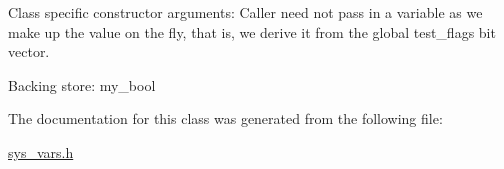 Class specific constructor arguments\+: Caller need not pass in a variable as we make up the value on the fly, that is, we derive it from the global test\+\_\+flags bit vector.

Backing store\+: my\+\_\+bool 

The documentation for this class was generated from the following file\+:\begin{DoxyCompactItemize}
\item 
\mbox{\hyperlink{sys__vars_8h}{sys\+\_\+vars.\+h}}\end{DoxyCompactItemize}
